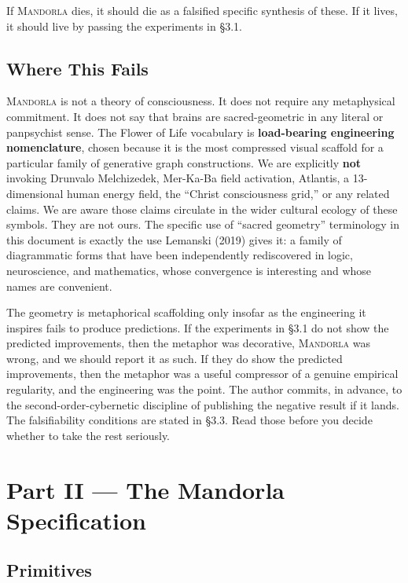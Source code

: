 \documentclass[11pt,a4paper]{article}
\begin{document}
If \textsc{Mandorla} dies, it should die as a falsified specific synthesis of these. If it lives, it should live by passing the experiments in \S 3.1.

\subsection{Where This Fails}

\textsc{Mandorla} is not a theory of consciousness. It does not require any metaphysical commitment. It does not say that brains are sacred-geometric in any literal or panpsychist sense. The Flower of Life vocabulary is \textbf{load-bearing engineering nomenclature}, chosen because it is the most compressed visual scaffold for a particular family of generative graph constructions. We are explicitly \textbf{not} invoking Drunvalo Melchizedek, Mer-Ka-Ba field activation, Atlantis, a 13-dimensional human energy field, the ``Christ consciousness grid,'' or any related claims. We are aware those claims circulate in the wider cultural ecology of these symbols. They are not ours. The specific use of ``sacred geometry'' terminology in this document is exactly the use Lemanski (2019) gives it: a family of diagrammatic forms that have been independently rediscovered in logic, neuroscience, and mathematics, whose convergence is interesting and whose names are convenient.

The geometry is metaphorical scaffolding only insofar as the engineering it inspires fails to produce predictions. If the experiments in \S 3.1 do not show the predicted improvements, then the metaphor was decorative, \textsc{Mandorla} was wrong, and we should report it as such. If they do show the predicted improvements, then the metaphor was a useful compressor of a genuine empirical regularity, and the engineering was the point. The author commits, in advance, to the second-order-cybernetic discipline of publishing the negative result if it lands. The falsifiability conditions are stated in \S 3.3. Read those before you decide whether to take the rest seriously.

\section{Part II --- The Mandorla Specification}

\subsection{Primitives}
\end{document}
